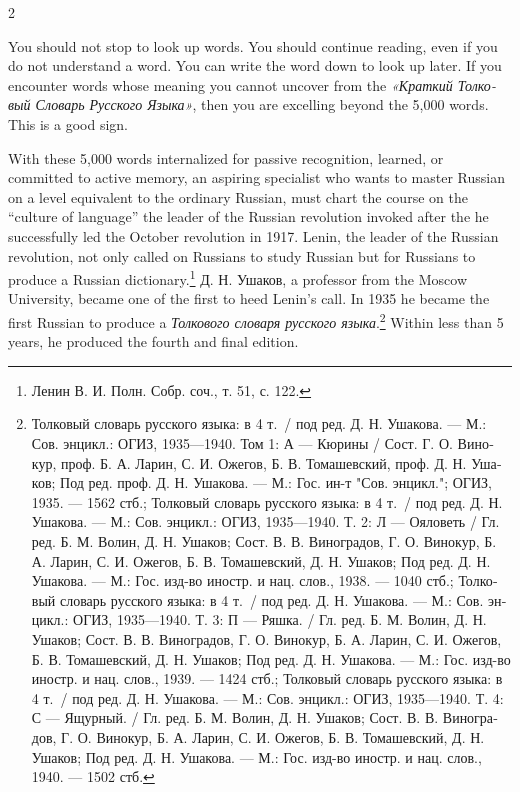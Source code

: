 \documentclass[10pt,a4paper,twoside]{article} %
\begin{document}
\begin{multicols}{2}
{\newline \indent You should not stop to look up words. You should continue reading, even if you do not understand a word. You can write the word down to look up later. If you encounter words whose meaning you cannot uncover from the  \textrussian{\emph{«Краткий Толковый Словарь Русского Языка»}}, then you are excelling beyond the 5,000 words. This is a good sign. 

\newline \indent With these 5,000 words internalized for passive recognition, learned, or committed to active memory, an aspiring specialist who wants to master Russian on a level equivalent to the ordinary Russian, must chart the course on the “culture of language” the leader of the Russian revolution invoked after the he successfully led the October revolution in 1917. Lenin, the leader of the Russian revolution, not only called on Russians to study Russian but for Russians to produce a Russian dictionary.\footnote{\textrussian{Ленин В. И.  Полн. Собр. соч., т. 51, с. 122.}} \textrussian{Д. Н. Ушаков}, a professor from the Moscow University, became one of the first to heed Lenin’s call. In 1935 he became the first Russian to produce a \textrussian{\emph{Толкового словаря русского языка}}.\footnote{\textrussian{Толковый словарь русского языка: в 4 т. / под ред. Д. Н. Ушакова. — М.: Сов. энцикл.: ОГИЗ, 1935—1940. Том 1: А — Кюрины / Сост. Г. О. Винокур, проф. Б. А. Ларин, С. И. Ожегов, Б. В. Томашевский, проф. Д. Н. Ушаков; Под ред. проф. Д. Н. Ушакова. — М.: Гос. ин-т "Сов. энцикл."; ОГИЗ, 1935. — 1562 стб.}; \textrussian{Толковый словарь русского языка: в 4 т. / под ред. Д. Н. Ушакова. — М.: Сов. энцикл.: ОГИЗ, 1935—1940. Т. 2: Л — Ояловеть / Гл. ред. Б. М. Волин, Д. Н. Ушаков; Сост. В. В. Виноградов, Г. О. Винокур, Б. А. Ларин, С. И. Ожегов, Б. В. Томашевский, Д. Н. Ушаков; Под ред. Д. Н. Ушакова. — М.: Гос. изд-во иностр. и нац. слов., 1938. — 1040 стб.}; \textrussian{Толковый словарь русского языка: в 4 т. / под ред. Д. Н. Ушакова. — М.: Сов. энцикл.: ОГИЗ, 1935—1940. Т. 3: П — Ряшка. / Гл. ред. Б. М. Волин, Д. Н. Ушаков; Сост. В. В. Виноградов, Г. О. Винокур, Б. А. Ларин, С. И. Ожегов, Б. В. Томашевский, Д. Н. Ушаков; Под ред. Д. Н. Ушакова. — М.: Гос. изд-во иностр. и нац. слов., 1939. — 1424 стб.}; \textrussian{Толковый словарь русского языка: в 4 т. / под ред. Д. Н. Ушакова. — М.: Сов. энцикл.: ОГИЗ, 1935—1940. Т. 4: С — Ящурный. / Гл. ред. Б. М. Волин, Д. Н. Ушаков; Сост. В. В. Виноградов, Г. О. Винокур, Б. А. Ларин, С. И. Ожегов, Б. В. Томашевский, Д. Н. Ушаков; Под ред. Д. Н. Ушакова. — М.: Гос. изд-во иностр. и нац. слов., 1940. — 1502 стб.}
} Within less than 5 years, he produced the fourth and final edition. 

}
\end{multicols}
\end{document}
